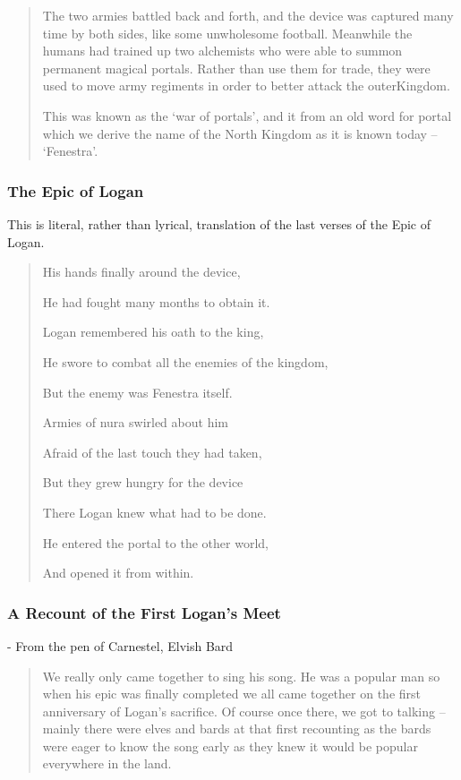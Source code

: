 \begin{multicols}{2}
\begin{quotation}
	The two armies battled back and forth, and the device was captured many time by both sides, like some unwholesome football.
	Meanwhile the humans had trained up two alchemists who were able to summon permanent magical portals.
	Rather than use them for trade, they were used to move army regiments in order to better attack the \gls{outerKingdom}.

	This was known as the `war of portals', and it from an old word for portal which we derive the name of the North Kingdom as it is known today -- `Fenestra'.

\end{quotation}

\subsubsection{The Epic of Logan}

This is literal, rather than lyrical, translation of the last verses of the Epic of Logan.

\begin{verse}

	His hands finally around the device,

	He had fought many months to obtain it.

	Logan remembered his oath to the king,

	He swore to combat all the enemies of the kingdom,

	But the enemy was Fenestra itself.

	Armies of nura swirled about him

	Afraid of the last touch they had taken,

	But they grew hungry for the device

	There Logan knew what had to be done.

	He entered the portal to the other world,

	And opened it from within.

\end{verse}

\subsubsection{A Recount of the First Logan's Meet}

- From the pen of Carnestel, Elvish Bard

\begin{quotation}

	We really only came together to sing his song.
	He was a popular man so when his epic was finally completed we all came together on the first anniversary of Logan's sacrifice.
	Of course once there, we got to talking -- mainly there were elves and bards at that first recounting as the bards were eager to know the song early as they knew it would be popular everywhere in the land.


\end{quotation}
\end{multicols}
